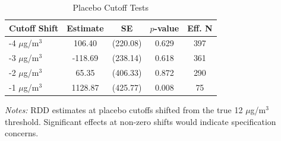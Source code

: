 \begin{table}[htbp]
\centering
\caption{Placebo Cutoff Tests}
\label{tab:placebos}
\begin{tabular}{lcccc}
\toprule
Cutoff Shift & Estimate & SE & $p$-value & Eff. N \\
\midrule
-4 $\mu$g/m$^3$ & 106.40 & (220.08) & 0.629 & 397 \\
-3 $\mu$g/m$^3$ & -118.69 & (238.14) & 0.618 & 361 \\
-2 $\mu$g/m$^3$ & 65.35 & (406.33) & 0.872 & 290 \\
-1 $\mu$g/m$^3$ & 1128.87 & (425.77) & 0.008 & 75 \\
\bottomrule
\end{tabular}
\begin{tablenotes}
\small
\item \textit{Notes:} RDD estimates at placebo cutoffs shifted from the true 12 $\mu$g/m$^3$ threshold. Significant effects at non-zero shifts would indicate specification concerns.
\end{tablenotes}
\end{table}
